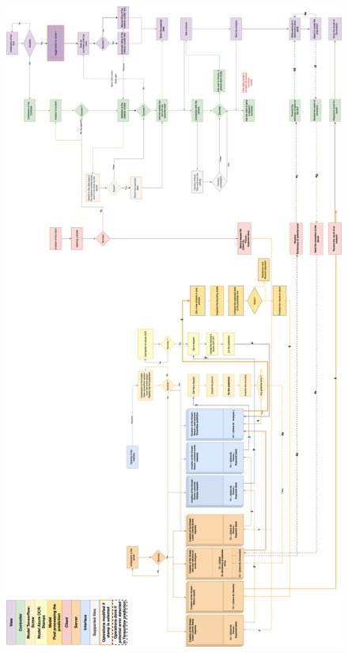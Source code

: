 \documentclass[12pt, french, a4paper]{article} %
\begin{document}
\begin{landscape}
\begin{figure}[H]
 \centering
 \includegraphics[angle=270,origin=c, width= 1\textwidth]{figure/MVC_SCA-3.png}
 \vspace{-2cm}

\end{figure}
\end{landscape}
\end{document}
